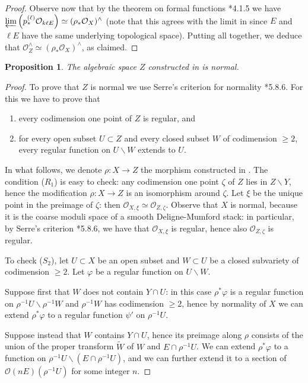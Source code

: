 \documentclass{amsart}
\newcommand{\cO}{\mathcal{O}}
\newtheorem{Prop}[theorem]{Proposition}
\theoremstyle{definition}
\begin{document}
\begin{proof}
     Observe now that by the theorem on formal functions \cite{EGAIII}*{4.1.5} we have $\varprojlim\left(p^{(\ell)}_*\cO_{k\ell E} \right) \simeq (\rho_*\cO_X)^\wedge$ (note that this agrees with the limit in  since $E$ and $\ell E$ have the same underlying topological space). Putting all together, we deduce that $\cO_Z^\wedge\simeq (\rho_*\cO_X)^\wedge$, as claimed.
    \end{proof}

    \begin{Prop}
        The algebraic space $Z$ constructed in  is normal.
    \end{Prop}
\begin{proof}
    To prove that $Z$ is normal we use Serre's criterion for normality \cite{EGAIV}*{5.8.6}. For this we have to prove that
    \begin{enumerate}
    \item[($R_1$)] every codimension one point of $Z$ is regular, and
    \item[($S_2$)] for every open subset $U\subset Z$ and every closed subset $W$ of codimension $\geq 2$, every regular function on $U\smallsetminus W$ extends to $U$.
    \end{enumerate}
    In what follows, we denote $\rho:X\to Z$ the morphism constructed in .
    The condition ($R_1$) is easy to check: any codimension one point $\zeta$ of $Z$ lies in $Z\smallsetminus Y$, hence the modification $\rho:X\to Z$ is an isomorphism around $\zeta$. Let $\xi$ be the unique point in the preimage of $\zeta$: then $\cO_{X,\xi}\simeq\cO_{Z,\zeta}$. Observe that $X$ is normal, because it is the coarse moduli space of a smooth Deligne-Mumford stack: in particular, by Serre's criterion \cite{EGAIV}*{5.8.6}, we have that $\cO_{X,\xi}$ is regular, hence also $\cO_{Z,\zeta}$ is regular.

    To check ($S_2$), let $U\subset X$ be an open subset and $W\subset U$ be a closed subvariety of codimension $\geq 2$. Let $\varphi$ be a regular function on $U\smallsetminus W$. 
    
    Suppose first that $W$ does not contain $Y\cap U$: in this case $\rho^*\varphi$ is a regular function on $\rho^{-1}U \smallsetminus \rho^{-1}W$ and $\rho^{-1}W$ has codimension $\geq 2$, hence by normality of $X$ we can extend $\rho^*\varphi$ to a regular function $\psi'$ on $\rho^{-1}U$. 

    Suppose instead that $W$ contains $Y\cap U$, hence its preimage along $\rho$ consists of the union of the proper transform $\widetilde{W}$ of $W$ and $E\cap \rho^{-1}U$. We can extend $\rho^*\varphi$ to a function on $\rho^{-1}U\smallsetminus (E\cap \rho^{-1}U)$, and we can further extend it to a section of $\cO(nE)(\rho^{-1}U)$ for some integer $n$. 
    

\end{proof}
\end{document}
